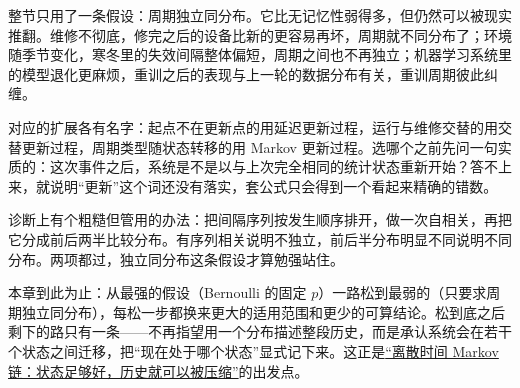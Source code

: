 整节只用了一条假设：周期独立同分布。它比无记忆性弱得多，但仍然可以被现实推翻。维修不彻底，修完之后的设备比新的更容易再坏，周期就不同分布了；环境随季节变化，寒冬里的失效间隔整体偏短，周期之间也不再独立；机器学习系统里的模型退化更麻烦，重训之后的表现与上一轮的数据分布有关，重训周期彼此纠缠。

对应的扩展各有名字：起点不在更新点的用延迟更新过程，运行与维修交替的用交替更新过程，周期类型随状态转移的用 Markov 更新过程。选哪个之前先问一句实质的：这次事件之后，系统是不是以与上次完全相同的统计状态重新开始？答不上来，就说明``更新''这个词还没有落实，套公式只会得到一个看起来精确的错数。

诊断上有个粗糙但管用的办法：把间隔序列按发生顺序排开，做一次自相关，再把它分成前后两半比较分布。有序列相关说明不独立，前后半分布明显不同说明不同分布。两项都过，独立同分布这条假设才算勉强站住。

本章到此为止：从最强的假设（Bernoulli 的固定 \(p\)）一路松到最弱的（只要求周期独立同分布），每松一步都换来更大的适用范围和更少的可算结论。松到底之后剩下的路只有一条——不再指望用一个分布描述整段历史，而是承认系统会在若干个状态之间迁移，把``现在处于哪个状态''显式记下来。这正是\hyperref[ch:048]{``离散时间 Markov 链：状态足够好，历史就可以被压缩''}的出发点。

